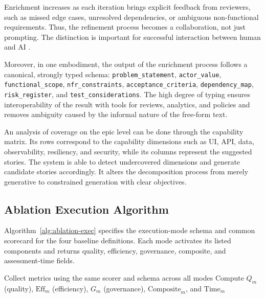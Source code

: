 \documentclass[10pt,a4paper]{article}
\begin{document}
Enrichment increases as each iteration brings explicit feedback from reviewers, such as missed edge cases, unresolved dependencies, or ambiguous non-functional requirements. Thus, the refinement process becomes a collaboration, not just prompting. The distinction is important for successful interaction between human and AI \citep{R56,R57}.

Moreover, in one embodiment, the output of the enrichment process follows a canonical, strongly typed schema:
\texttt{problem\_statement}, \texttt{actor\_value}, \texttt{functional\_scope}, \texttt{nfr\_constraints}, \texttt{acceptance\_criteria},
\texttt{dependency\_map}, \texttt{risk\_register}, and \texttt{test\_considerations}. The high degree of typing ensures interoperability of the result with tools for reviews, analytics, and policies and removes ambiguity caused by the informal nature of the free-form text.

An analysis of coverage on the epic level can be done through the capability matrix. Its rows correspond to the capability dimensions such as UI, API, data, observability, resiliency, and security, while its columns represent the suggested stories. The system is able to detect undercovered dimensions and generate candidate stories accordingly. It alters the decomposition process from merely generative to constrained generation with clear objectives.

\subsection{Ablation Execution Algorithm}
Algorithm~\ref{alg:ablation-exec} specifies the execution-mode schema and common scorecard for the four baseline definitions. Each mode activates its listed components and returns quality, efficiency, governance, composite, and assessment-time fields.

\begin{algorithm*}[t]
\DontPrintSemicolon
\footnotesize
\caption{Ablation-Mode Execution for B0/B1/B2/B3 Comparison}
\label{alg:ablation-exec}
Collect metrics using the same scorer and schema across all modes\;
Compute $Q_m$ (quality), $\mathrm{Eff}_m$ (efficiency), $G_m$ (governance), $\mathrm{Composite}_m$, and $\mathrm{Time}_m$\;
\;
\end{algorithm*}
\end{document}
